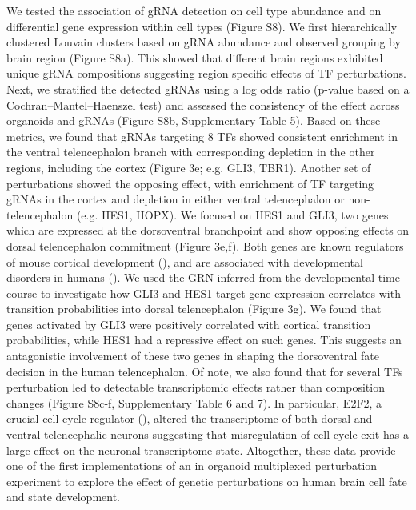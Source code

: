 We tested the association of gRNA detection on cell type abundance and on differential gene expression within cell types (Figure S8). We first hierarchically clustered Louvain clusters based on gRNA abundance and observed grouping by brain region (Figure S8a). This showed that different brain regions exhibited unique gRNA compositions suggesting region specific effects of TF perturbations. Next, we stratified the detected gRNAs using a log odds ratio (p-value based on a Cochran–Mantel–Haenszel test) and assessed the consistency of the effect across organoids and gRNAs (Figure S8b, Supplementary Table 5). Based on these metrics, we found that gRNAs targeting 8 TFs showed consistent enrichment in the ventral telencephalon branch with corresponding depletion in the other regions, including the cortex (Figure 3e; e.g. GLI3, TBR1). Another set of perturbations showed the opposing effect, with enrichment of TF targeting gRNAs in the cortex and depletion in either ventral telencephalon or non-telencephalon (e.g. HES1, HOPX). We focused on HES1 and GLI3, two genes which are expressed at the dorsoventral branchpoint and show opposing effects on dorsal telencephalon commitment (Figure 3e,f). Both genes are known regulators of mouse cortical development (\cite{nakamura_bhlh_2000,wang_gli3_2011,hasenpusch-theil_gli3_2018}), and are associated with developmental disorders in humans (\cite{song_non-coding_2021,biesecker_greig_2008}). We used the GRN inferred from the developmental time course to investigate how GLI3 and HES1 target gene expression correlates with transition probabilities into dorsal telencephalon (Figure 3g). We found that genes activated by GLI3 were positively correlated with cortical transition probabilities, while HES1 had a repressive effect on such genes. This suggests an antagonistic involvement of these two genes in shaping the dorsoventral fate decision in the human telencephalon. Of note, we also found that for several TFs perturbation led to detectable transcriptomic effects rather than composition changes (Figure S8c-f, Supplementary Table 6 and 7). In particular, E2F2, a crucial cell cycle regulator (\cite{swiss_cell-context_2010}), altered the transcriptome of both dorsal and ventral telencephalic neurons suggesting that misregulation of cell cycle exit has a large effect on the neuronal transcriptome state. Altogether, these data provide one of the first implementations of an in organoid multiplexed perturbation experiment to explore the effect of genetic perturbations on human brain cell fate and state development.


